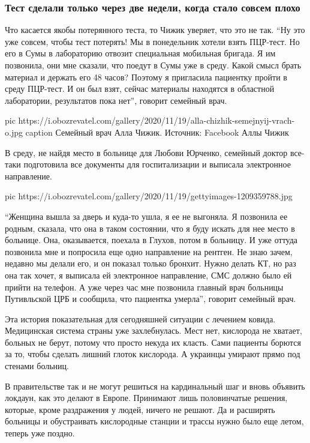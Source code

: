  
 
 

\subsubsection{Тест сделали только через две недели, когда стало совсем плохо}

Что касается якобы потерянного теста, то Чижик уверяет, что это не так. \enquote{Ну это
уже совсем, чтобы тест потерять! Мы в понедельник хотели взять ПЦР-тест. Но его
в Сумы в лабораторию отвозит специальная мобильная бригада. Я им позвонила, они
мне сказали, что поедут в Сумы уже в среду. Какой смысл брать материал и
держать его 48 часов? Поэтому я пригласила пациентку пройти в среду ПЦР-тест. И
он был взят, сейчас материалы находятся в областной лаборатории, результатов
пока нет}, \dshM говорит семейный врач.

\ifcmt
pic https://i.obozrevatel.com/gallery/2020/11/19/alla-chizhik-semejnyij-vrach-o.jpg
caption Семейный врач Алла Чижик. Источник: Facebook Аллы Чижик
\fi

В среду, не найдя место в больнице для Любови Юрченко, семейный доктор все-таки
подготовила все документы для госпитализации и выписала электронное
направление.

\ifcmt
pic https://i.obozrevatel.com/gallery/2020/11/19/gettyimages-1209359788.jpg
\fi

\enquote{Женщина вышла за дверь и куда-то ушла, я ее не выгоняла. Я позвонила ее
родным, сказала, что она в таком состоянии, что я буду искать для нее место в
больнице. Она, оказывается, поехала в Глухов, потом в больницу. И уже оттуда
позвонила мне и попросила еще одно направление на рентген. Не знаю зачем,
недавно мы делали его, и он показал только бронхит. Нужно делать КТ, но раз она
так хочет, я выписала ей электронное направление, СМС должно было ей прийти на
телефон. А уже через час мне позвонила главный врач больницы Путивльской ЦРБ и
сообщила, что пациентка умерла}, \dshM говорит семейный врач.

Эта история показательная для сегодняшней ситуации с лечением ковида.
Медицинская система страны уже захлебнулась. Мест нет, кислорода не хватает,
больных не берут, потому что просто некуда их класть. Сами пациенты борются за
то, чтобы сделать лишний глоток кислорода. А украинцы умирают прямо под стенами
больниц.

В правительстве так и не могут решиться на кардинальный шаг и вновь объявить
локдаун, как это делают в Европе. Принимают лишь половинчатые решения, которые,
кроме раздражения у людей, ничего не решают. Да и расширять больницы и
обустраивать кислородные станции и трассы нужно было еще летом, теперь уже
поздно.

